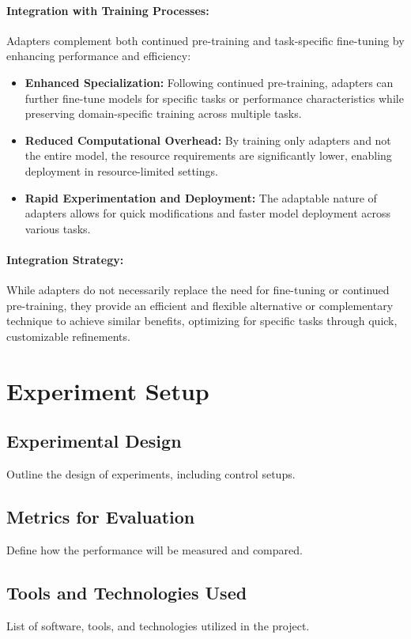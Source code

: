 \documentclass[12pt]{article}
\begin{document}
\paragraph{Integration with Training Processes:}
Adapters complement both continued pre-training and task-specific fine-tuning by enhancing performance and efficiency:
\begin{itemize}
    \item \textbf{Enhanced Specialization:} Following continued pre-training, adapters can further fine-tune models for specific tasks or performance characteristics while preserving domain-specific training across multiple tasks.
    \item \textbf{Reduced Computational Overhead:} By training only adapters and not the entire model, the resource requirements are significantly lower, enabling deployment in resource-limited settings.
    \item \textbf{Rapid Experimentation and Deployment:} The adaptable nature of adapters allows for quick modifications and faster model deployment across various tasks.
\end{itemize}

\paragraph{Integration Strategy:}
While adapters do not necessarily replace the need for fine-tuning or continued pre-training, they provide an efficient and flexible alternative or complementary technique to achieve similar benefits, optimizing for specific tasks through quick, customizable refinements.


\section{Experiment Setup}
\subsection{Experimental Design}
Outline the design of experiments, including control setups.
\subsection{Metrics for Evaluation}
Define how the performance will be measured and compared.
\subsection{Tools and Technologies Used}
List of software, tools, and technologies utilized in the project.
\end{document}
